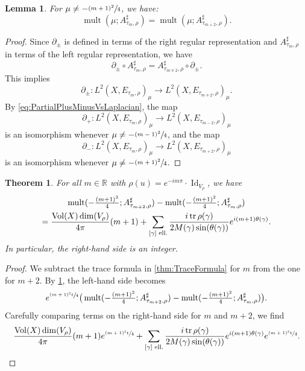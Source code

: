 \documentclass[JEP,XML,SOM,Unicode,NoFloatCountersInSection,published]{cedram}
\theoremstyle{plain}
\newtheorem{lem}[thm]{Lemma}
\newtheorem{theorem}[thm]{Theorem}
\theoremstyle{definition}
\theoremstyle{remark}
\newcommand{\R}{\mathbb{R}}
\DeclareMathOperator{\tr}{tr}
\DeclareMathOperator{\Vol}{Vol}
\DeclareMathOperator{\Id}{Id}
\numberwithin{equation}{section}
\DeclareMathOperator{\mult}{mult}
\begin{document}
\begin{lem}\label{lem:MultiplicitiesModM}
For $\mu\neq-\sfrac{(m+1)^2}{4}$, we have:
\[
\mult(\mu;A_{\tau_m,\rho}^\sharp) = \mult(\mu;A_{\tau_{m+2},\rho}^\sharp).
\]
\end{lem}

\begin{proof}
Since $\partial_\pm$ is defined in terms of the right regular representation and $A_{\tau_m,\rho}^\sharp$ in terms of the left regular representation, we have
\[
\partial_\pm\circ A_{\tau_m,\rho}^\sharp = A_{\tau_{m\mp2},\rho}^\sharp\circ\partial_\pm.
\]
This implies
\[
\partial_\pm:L^2(X,E_{\tau_m,\rho})_\mu\to L^2(X,E_{\tau_{m\mp2},\rho})_\mu.
\]
By \cref{eq:PartialPlusMinusVsLaplacian}, the map
\[
\partial_+:L^2(X,E_{\tau_m,\rho})_\mu\to L^2(X,E_{\tau_{m-2},\rho})_\mu
\]
is an isomorphism whenever $\mu\neq-\sfrac{(m-1)^2}{4}$, and the map
\[
\partial_-:L^2(X,E_{\tau_m,\rho})_\mu\to L^2(X,E_{\tau_{m+2},\rho})_\mu
\]
is an isomorphism whenever $\mu\neq-\sfrac{(m+1)^2}{4}$.
\end{proof}

\begin{theorem}\label{thm:DimensionEigenspaces}
For all $m\in\R$ with $\rho(u)=e^{-im\pi}\cdot\Id_{V_\rho}$, we have
\begin{multline*}
\mult(-\tfrac{(m+1)^2}{4};A_{\tau_{m+2},\rho}^\sharp)-\mult(-\tfrac{(m+1)^2}{4};A_{\tau_m,\rho}^\sharp)\\
= \frac{\Vol(X)\dim(V_\rho)}{4\pi}(m+1) +\sum_{[\gamma]\textup{ ell.}}\frac{i\tr\rho(\gamma)}{2M(\gamma)\sin(\theta(\gamma))}e^{i(m+1)\theta(\gamma)}.
\end{multline*}
In particular, the right-hand side is an integer.
\end{theorem}

\begin{proof}
We subtract the trace formula in \cref{thm:TraceFormula} for $m$ from the one for $m+2$. By \cref{lem:MultiplicitiesModM}, the left-hand side becomes
\[
e^{\sfrac{(m+1)^2t}{4}}\big(\mult(-\tfrac{(m+1)^2}{4};A_{\tau_{m+2},\rho}^\sharp)-\mult(-\tfrac{(m+1)^2}{4};A_{\tau_m,\rho}^\sharp)\big).
\]
Carefully comparing terms on the right-hand side for $m$ and $m+2$, we find
\begin{equation*}
\frac{\Vol(X)\dim(V_\rho)}{4\pi}(m+1)e^{\sfrac{(m+1)^2t}{4}}+\sum_{[\gamma]\textup{ ell.}}\frac{i\tr\rho(\gamma)}{2M(\gamma)\sin(\theta(\gamma))}e^{i(m+1)\theta(\gamma)}e^{\sfrac{(m+1)^2t}{4}}.\qedhere
\end{equation*}
\end{proof}
\end{document}
